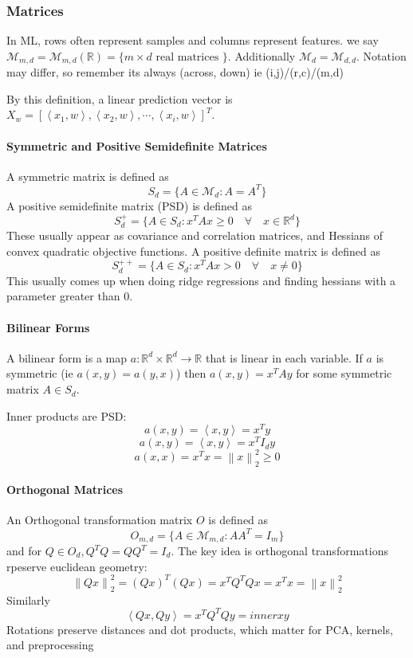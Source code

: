 \documentclass[12pt,oneside]{book}
\numberwithin{equation}{section}
\theoremstyle{definition}
\theoremstyle{plain}
\theoremstyle{remark}
\newcommand{\R}{\mathbb{R}}
\newcommand{\norm}[1]{\left\lVert #1 \right\rVert}
\newcommand{\inner}[2]{\left\langle #1, #2 \right\rangle}
\begin{document}
\subsubsection{Matrices}
In ML, rows often represent samples and columns represent features. we say $\mathcal{M}_{m,d}=\mathcal{M}_{m,d}(\R)=\{m \times d \text{ real matrices }\}$. Additionally $\mathcal{M}_d=\mathcal{M}_{d,d}$. Notation may differ, so remember its always (across, down) ie (i,j)/(r,c)/(m,d)

By this definition, a linear prediction vector is $X_w = [\inner{x_1}{w}, \inner{x_2}{w}, \cdots, \inner{x_i}{w}]^T$.

\paragraph{Symmetric and Positive Semidefinite Matrices}
A symmetric matrix is defined as \[S_d=\{A \in \mathcal{M}_d : A = A^T\}\]
A positive semidefinite matrix (PSD) is defined as \[S_d^+ =\{A \in S_d : x^TAx \ge 0 \quad \forall \quad x \in \R^d\}\] These usually appear as covariance and correlation matrices, and Hessians of convex quadratic objective functions.
A positive definite matrix is defined as \[S_d^{++} =\{A \in S_d : x^TAx > 0 \quad \forall \quad x \ne 0\}\] This usually comes up when doing ridge regressions and finding hessians with a parameter greater than 0. 

\paragraph{Bilinear Forms} A bilinear form is a map $a: \R^d \times \R^d \rightarrow \R$ that is linear in each variable. If $a$ is symmetric (ie $a(x,y)=a(y,x)$) then $a(x,y)=x^TAy$ for some symmetric matrix $A \in S_d$.

Inner products are PSD:
\[a(x,y)=\inner{x}{y}=x^Ty\]
\[a(x,y)=\inner{x}{y}=x^TI_dy\]
\[a(x,x)=x^Tx=\norm{x}_2^2 \ge 0\]

\paragraph{Orthogonal Matrices}
An Orthogonal transformation matrix $O$ is defined as \[O_{m,d}=\{A \in \mathcal{M}_{m,d} : AA^T = I_m\}\] and for $Q \in O_d, Q^TQ=QQ^T=I_d$. The key idea is orthogonal transformations rpeserve euclidean geometry:
\[\norm{Qx}_2^2 = (Qx)^T(Qx)=x^TQ^TQx=x^Tx=\norm{x}_2^2\]
Similarly \[\inner{Qx}{Qy}=x^TQ^TQy=
inner{x}{y}\] Rotations preserve distances and dot products, which matter for PCA, kernels, and preprocessing
\end{document}
